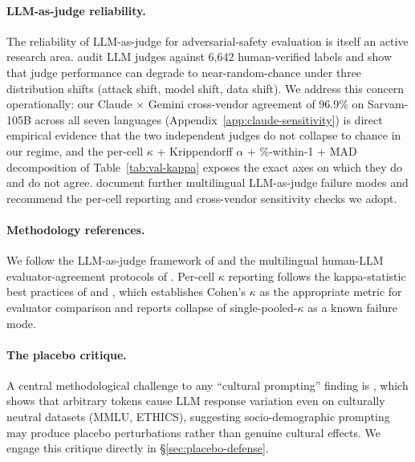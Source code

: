 \documentclass[11pt,twocolumn,a4paper]{article}
\begin{document}
\paragraph{LLM-as-judge reliability.}
The reliability of LLM-as-judge for adversarial-safety evaluation is itself an active research area. \citet{schwinn2026coinflip} audit LLM judges against 6{,}642 human-verified labels and show that judge performance can degrade to near-random-chance under three distribution shifts (attack shift, model shift, data shift). We address this concern operationally: our Claude $\times$ Gemini cross-vendor agreement of 96.9\% on Sarvam-105B across all seven languages (Appendix~\ref{app:claude-sensitivity}) is direct empirical evidence that the two independent judges do not collapse to chance in our regime, and the per-cell $\kappa$ + Krippendorff $\alpha$ + \%-within-1 + MAD decomposition of Table~\ref{tab:val-kappa} exposes the exact axes on which they do and do not agree. \citet{multilingualjudges2026} document further multilingual LLM-as-judge failure modes and recommend the per-cell reporting and cross-vendor sensitivity checks we adopt.

\paragraph{Methodology references.}
We follow the LLM-as-judge framework of \citet{hada2024llmevaluators} and the multilingual human-LLM evaluator-agreement protocols of \citet{watts2024pariksha}. Per-cell $\kappa$ reporting follows the kappa-statistic best practices of \citet{mchugh2012kappa} and \citet{banerjee2025judgesverdict}, which establishes Cohen's $\kappa$ as the appropriate metric for evaluator comparison and reports collapse of single-pooled-$\kappa$ as a known failure mode.

\paragraph{The placebo critique.}
A central methodological challenge to any ``cultural prompting'' finding is \citet{mukherjee2024cultural}, which shows that arbitrary tokens cause LLM response variation even on culturally neutral datasets (MMLU, ETHICS), suggesting socio-demographic prompting may produce placebo perturbations rather than genuine cultural effects. We engage this critique directly in \S\ref{sec:placebo-defense}.
\end{document}
